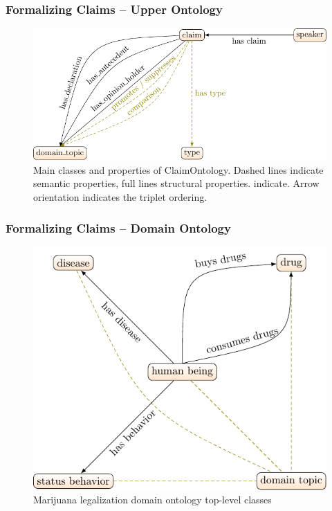 \documentclass{beamer}
\begin{document}
\begin{frame}
	\frametitle{Formalizing Claims -- Upper Ontology}

\begin{figure}
	\centering
	\footnotesize
	\includegraphics[scale=0.8]{../formalizations_main_classes-figure0.pdf}
\caption{Main classes and properties of ClaimOntology. Dashed lines indicate
	semantic properties, full lines structural properties. 
	indicate. Arrow orientation indicates the
	triplet ordering. }
\end{figure}
\end{frame}

\begin{frame}
	\frametitle{Formalizing Claims -- Domain Ontology}

\begin{figure}
	\centering
	\includegraphics[scale=0.8]{../formalizations_marijuana_main_classes-figure0.pdf}
\caption{Marijuana legalization domain ontology top-level classes}
\end{figure}
\end{frame}
\end{document}
